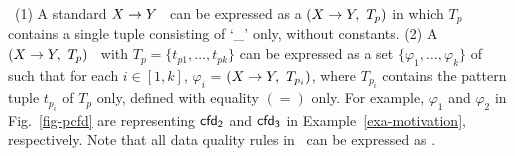 ~(1) A standard \FD $X\rightarrow Y$~\cite{AbHuVi1995} can
be expressed as a \CFD $(X\rightarrow Y,\ T_p)$ in which $T_p$ contains a
single tuple consisting of `\_' only, without constants. (2) A
\CFD $(X\rightarrow Y,\ T_p)$~\cite{CFDs} with
$T_p = \{t_{p1},\ldots, t_{pk}\}$ can be
expressed as a set $\{\varphi_1,\ldots,\varphi_k\}$ of
\pCFDs such that for each $i\in [1, k]$, $\varphi_i$ = $(X\rightarrow Y,\
T_{p_i})$, where $T_{p_i}$ contains the pattern tuple $t_{p_i}$ of
$T_p$ only, defined with equality $(=)$ only.
For example, $\varphi_1$ and $\varphi_2$ in
Fig.~\ref{fig-pcfd} are \pCFDs representing \FD ${\mathsf{cfd_2}}$
and \CFD ${\mathsf{cfd_3}}$ in Example~\ref{exa-motivation}, respectively.
Note that all data quality
rules in~\cite{CM08,divesh08} can be expressed as
\pCFDs.

